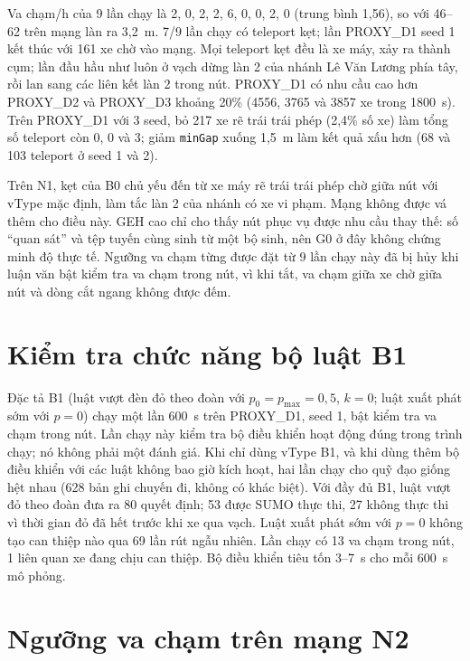 \documentclass[../main.tex]{subfiles}
\begin{document}
Va chạm/h của 9 lần chạy là 2, 0, 2, 2, 6, 0, 0, 2, 0 (trung bình 1,56), so với 46--62 trên mạng làn ra 3,2~m. 7/9 lần chạy có teleport kẹt; lần PROXY\_D1 seed 1 kết thúc với 161 xe chờ vào mạng. Mọi teleport kẹt đều là xe máy, xảy ra thành cụm; lần đầu hầu như luôn ở vạch dừng làn 2 của nhánh Lê Văn Lương phía tây, rồi lan sang các liên kết làn 2 trong nút. PROXY\_D1 có nhu cầu cao hơn PROXY\_D2 và PROXY\_D3 khoảng 20\% (4556, 3765 và 3857 xe trong 1800~s). Trên PROXY\_D1 với 3 seed, bỏ 217 xe rẽ trái trái phép (2,4\% số xe) làm tổng số teleport còn 0, 0 và 3; giảm \texttt{minGap} xuống 1,5~m làm kết quả xấu hơn (68 và 103 teleport ở seed 1 và 2).

Trên N1, kẹt của B0 chủ yếu đến từ xe máy rẽ trái trái phép chờ giữa nút với vType mặc định, làm tắc làn 2 của nhánh có xe vi phạm. Mạng không được vá thêm cho điều này. GEH cao chỉ cho thấy nút phục vụ được nhu cầu thay thế: số ``quan sát'' và tệp tuyến cùng sinh từ một bộ sinh, nên G0 ở đây không chứng minh độ thực tế. Ngưỡng va chạm từng được đặt từ 9 lần chạy này đã bị hủy khi luận văn bật kiểm tra va chạm trong nút, vì khi tắt, va chạm giữa xe chờ giữa nút và dòng cắt ngang không được đếm.

\section{Kiểm tra chức năng bộ luật B1}
\label{subsection:b1_check}

Đặc tả B1 (luật vượt đèn đỏ theo đoàn với $p_0 = p_{\max} = 0{,}5$, $k = 0$; luật xuất phát sớm với $p = 0$) chạy một lần 600~s trên PROXY\_D1, seed 1, bật kiểm tra va chạm trong nút. Lần chạy này kiểm tra bộ điều khiển hoạt động đúng trong trình chạy; nó không phải một đánh giá. Khi chỉ dùng vType B1, và khi dùng thêm bộ điều khiển với các luật không bao giờ kích hoạt, hai lần chạy cho quỹ đạo giống hệt nhau (628 bản ghi chuyến đi, không có khác biệt). Với đầy đủ B1, luật vượt đỏ theo đoàn đưa ra 80 quyết định; 53 được SUMO thực thi, 27 không thực thi vì thời gian đỏ đã hết trước khi xe qua vạch. Luật xuất phát sớm với $p = 0$ không tạo can thiệp nào qua 69 lần rút ngẫu nhiên. Lần chạy có 13 va chạm trong nút, 1 liên quan xe đang chịu can thiệp. Bộ điều khiển tiêu tốn 3--7~s cho mỗi 600~s mô phỏng.

\section{Ngưỡng va chạm trên mạng N2}
\label{subsection:r28_f2}
\end{document}
